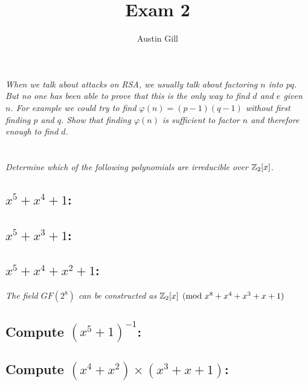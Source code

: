 \documentclass[12pt]{article}
\title{Exam 2}
\author{Austin Gill}
\begin{document}
\maketitle

\section{} \textit{When we talk about attacks on RSA, we usually talk about factoring $n$ into $pq$. But no one has been able to prove that this is the only way to find $d$ and $e$ given $n$. For example we could try to find $\varphi(n) = (p-1)(q-1)$ without first finding $p$ and $q$. Show that finding $\varphi(n)$ is sufficient to factor $n$ and therefore enough to find $d$.}

\newpage

\section{} \textit{Determine which of the following polynomials are irreducible over $\mathbb{Z}_2 [x]$.}

    \subsection{$x^5 + x^4 + 1$:}
    \subsection{$x^5 + x^3 + 1$:}
    \subsection{$x^5 + x^4 + x^2 + 1$:}

    \textit{The field $GF(2^8)$ can be constructed as $\mathbb{Z}_2[x] \pmod{x^8 + x^4 + x^3 + x + 1}$}

    \subsection{Compute ${(x^5 + 1)}^{-1}$:}
    \subsection{Compute $(x^4 + x^2) \times (x^3 + x + 1)$:}
\end{document}
